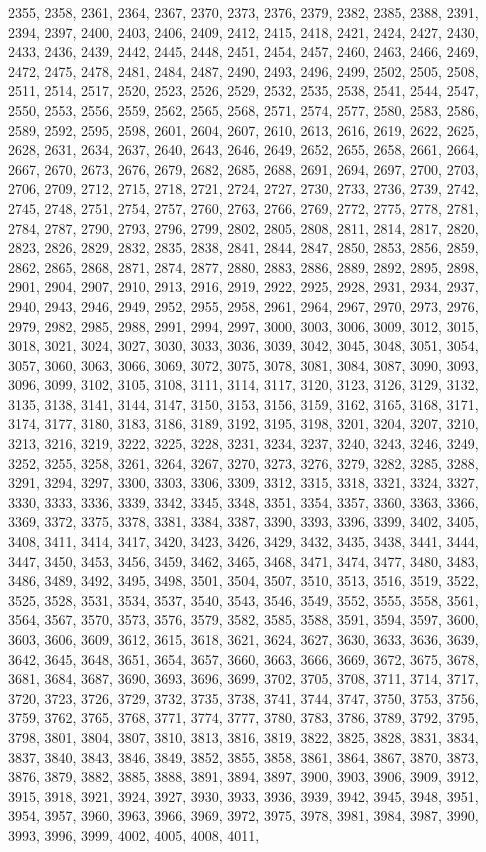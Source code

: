 \documentclass[../Cours.tex]{subfiles}
\begin{document}
\begin{questions}
2355, 2358, 2361, 2364, 2367, 2370, 2373, 2376, 2379, 2382, 2385, 2388, 2391, 2394, 2397, 2400, 2403, 2406, 2409, 2412, 2415, 2418, 2421, 2424, 2427, 2430, 2433, 2436, 2439, 2442, 2445, 2448, 2451, 2454, 2457, 2460, 2463, 2466, 2469, 2472, 2475, 2478, 2481, 2484, 2487, 2490, 2493, 2496, 2499, 2502, 2505, 2508, 2511, 2514, 2517, 2520, 2523, 2526, 2529, 2532, 2535, 2538, 2541, 2544, 2547, 2550, 2553, 2556, 2559, 2562, 2565, 2568, 2571, 2574, 2577, 2580, 2583, 2586, 2589, 2592, 2595, 2598, 2601, 2604, 2607, 2610, 2613, 2616, 2619, 2622, 2625, 2628, 2631, 2634, 2637, 2640, 2643, 2646, 2649, 2652, 2655, 2658, 2661, 2664, 2667, 2670, 2673, 2676, 2679, 2682, 2685, 2688, 2691, 2694, 2697, 2700, 2703, 2706, 2709, 2712, 2715, 2718, 2721, 2724, 2727, 2730, 2733, 2736, 2739, 2742, 2745, 2748, 2751, 2754, 2757, 2760, 2763, 2766, 2769, 2772, 2775, 2778, 2781, 2784, 2787, 2790, 2793, 2796, 2799, 2802, 2805, 2808, 2811, 2814, 2817, 2820, 2823, 2826, 2829, 2832, 2835, 2838, 2841, 2844, 2847, 2850, 2853, 2856, 2859, 2862, 2865, 2868, 2871, 2874, 2877, 2880, 2883, 2886, 2889, 2892, 2895, 2898, 2901, 2904, 2907, 2910, 2913, 2916, 2919, 2922, 2925, 2928, 2931, 2934, 2937, 2940, 2943, 2946, 2949, 2952, 2955, 2958, 2961, 2964, 2967, 2970, 2973, 2976, 2979, 2982, 2985, 2988, 2991, 2994, 2997, 3000, 3003, 3006, 3009, 3012, 3015, 3018, 3021, 3024, 3027, 3030, 3033, 3036, 3039, 3042, 3045, 3048, 3051, 3054, 3057, 3060, 3063, 3066, 3069, 3072, 3075, 3078, 3081, 3084, 3087, 3090, 3093, 3096, 3099, 3102, 3105, 3108, 3111, 3114, 3117, 3120, 3123, 3126, 3129, 3132, 3135, 3138, 3141, 3144, 3147, 3150, 3153, 3156, 3159, 3162, 3165, 3168, 3171, 3174, 3177, 3180, 3183, 3186, 3189, 3192, 3195, 3198, 3201, 3204, 3207, 3210, 3213, 3216, 3219, 3222, 3225, 3228, 3231, 3234, 3237, 3240, 3243, 3246, 3249, 3252, 3255, 3258, 3261, 3264, 3267, 3270, 3273, 3276, 3279, 3282, 3285, 3288, 3291, 3294, 3297, 3300, 3303, 3306, 3309, 3312, 3315, 3318, 3321, 3324, 3327, 3330, 3333, 3336, 3339, 3342, 3345, 3348, 3351, 3354, 3357, 3360, 3363, 3366, 3369, 3372, 3375, 3378, 3381, 3384, 3387, 3390, 3393, 3396, 3399, 3402, 3405, 3408, 3411, 3414, 3417, 3420, 3423, 3426, 3429, 3432, 3435, 3438, 3441, 3444, 3447, 3450, 3453, 3456, 3459, 3462, 3465, 3468, 3471, 3474, 3477, 3480, 3483, 3486, 3489, 3492, 3495, 3498, 3501, 3504, 3507, 3510, 3513, 3516, 3519, 3522, 3525, 3528, 3531, 3534, 3537, 3540, 3543, 3546, 3549, 3552, 3555, 3558, 3561, 3564, 3567, 3570, 3573, 3576, 3579, 3582, 3585, 3588, 3591, 3594, 3597, 3600, 3603, 3606, 3609, 3612, 3615, 3618, 3621, 3624, 3627, 3630, 3633, 3636, 3639, 3642, 3645, 3648, 3651, 3654, 3657, 3660, 3663, 3666, 3669, 3672, 3675, 3678, 3681, 3684, 3687, 3690, 3693, 3696, 3699, 3702, 3705, 3708, 3711, 3714, 3717, 3720, 3723, 3726, 3729, 3732, 3735, 3738, 3741, 3744, 3747, 3750, 3753, 3756, 3759, 3762, 3765, 3768, 3771, 3774, 3777, 3780, 3783, 3786, 3789, 3792, 3795, 3798, 3801, 3804, 3807, 3810, 3813, 3816, 3819, 3822, 3825, 3828, 3831, 3834, 3837, 3840, 3843, 3846, 3849, 3852, 3855, 3858, 3861, 3864, 3867, 3870, 3873, 3876, 3879, 3882, 3885, 3888, 3891, 3894, 3897, 3900, 3903, 3906, 3909, 3912, 3915, 3918, 3921, 3924, 3927, 3930, 3933, 3936, 3939, 3942, 3945, 3948, 3951, 3954, 3957, 3960, 3963, 3966, 3969, 3972, 3975, 3978, 3981, 3984, 3987, 3990, 3993, 3996, 3999, 4002, 4005, 4008, 4011, 
\end{questions}
\end{document}
